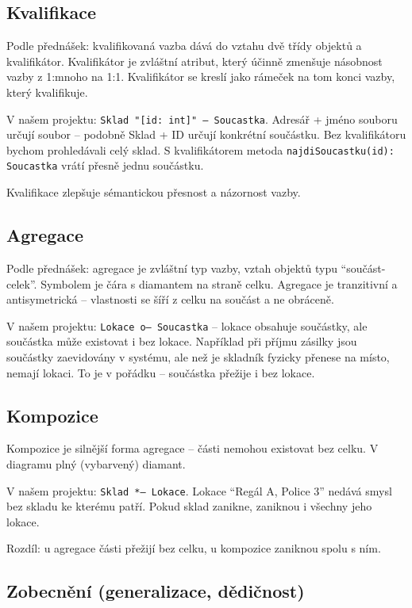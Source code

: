 \documentclass[12pt, a4paper]{article}
\begin{document}
\subsection{Kvalifikace}

Podle přednášek: kvalifikovaná vazba dává do vztahu dvě třídy objektů a kvalifikátor. Kvalifikátor je zvláštní atribut, který účinně zmenšuje násobnost vazby z 1:mnoho na 1:1. Kvalifikátor se kreslí jako rámeček na tom konci vazby, který kvalifikuje.

V našem projektu: \texttt{Sklad "[id: int]" -- Soucastka}. Adresář + jméno souboru určují soubor -- podobně Sklad + ID určují konkrétní součástku. Bez kvalifikátoru bychom prohledávali celý sklad. S kvalifikátorem metoda \texttt{najdiSoucastku(id): Soucastka} vrátí přesně jednu součástku.

Kvalifikace zlepšuje sémantickou přesnost a názornost vazby.

\subsection{Agregace}

Podle přednášek: agregace je zvláštní typ vazby, vztah objektů typu ``součást-celek''. Symbolem je čára s diamantem na straně celku. Agregace je tranzitivní a antisymetrická -- vlastnosti se šíří z celku na součást a ne obráceně.

V našem projektu: \texttt{Lokace o-- Soucastka} -- lokace obsahuje součástky, ale součástka může existovat i bez lokace. Například při příjmu zásilky jsou součástky zaevidovány v systému, ale než je skladník fyzicky přenese na místo, nemají lokaci. To je v pořádku -- součástka přežije i bez lokace.

\subsection{Kompozice}

Kompozice je silnější forma agregace -- části nemohou existovat bez celku. V diagramu plný (vybarvený) diamant.

V našem projektu: \texttt{Sklad *-- Lokace}. Lokace ``Regál A, Police 3'' nedává smysl bez skladu ke kterému patří. Pokud sklad zanikne, zaniknou i všechny jeho lokace.

Rozdíl: u agregace části přežijí bez celku, u kompozice zaniknou spolu s ním.

\subsection{Zobecnění (generalizace, dědičnost)}
\end{document}
